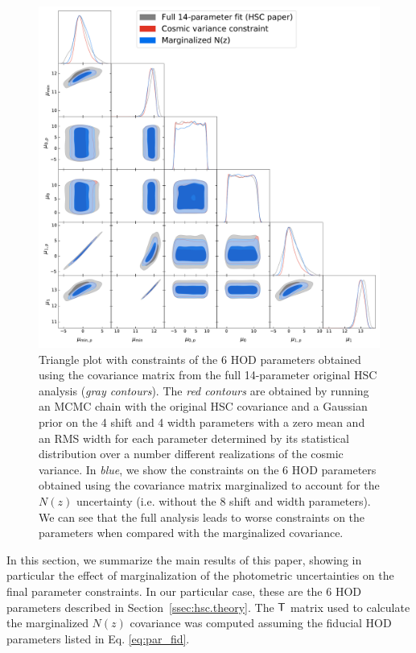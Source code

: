 \documentclass[a4paper,11pt]{article}
\begin{document}
      \begin{figure}
        \centering  
        \includegraphics[width=1.\textwidth]{./triangle_fid_marg}
        \caption{Triangle plot with constraints of the 6 HOD parameters obtained using the  covariance matrix from the full 14-parameter original HSC analysis (\textit{gray contours}). The \textit{red contours} are obtained by running an MCMC chain with the original HSC covariance and a Gaussian prior on the 4 shift and 4 width parameters with a zero mean and an RMS width for each parameter determined by its statistical distribution over a number different realizations of the cosmic variance. In \textit{blue}, we show the constraints on the 6 HOD parameters obtained using the covariance matrix marginalized to account for the $N(z)$ uncertainty (i.e. without the 8 shift and width parameters). We can see that the full analysis leads to worse constraints on the parameters when compared with the marginalized covariance.} \label{fig:triangle_fid_marg}
      \end{figure}
      In this section, we summarize the main results of this paper, showing in particular the effect of marginalization of the photometric uncertainties on the final parameter constraints. In our particular case, these are the 6 HOD parameters described in Section~\ref{ssec:hsc.theory}. The ${\sf T}$ matrix used to calculate the marginalized $N(z)$ covariance was computed assuming the fiducial HOD parameters listed in Eq. \ref{eq:par_fid}.
\end{document}
